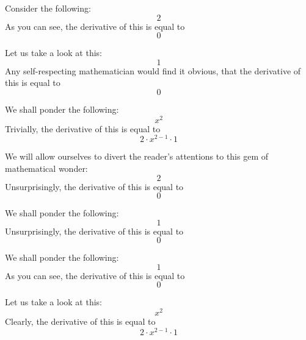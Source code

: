\documentclass{article}
\begin{document}
Consider the following:
\begin{equation}
2 
\end{equation}
As you can see, the derivative of this is equal to
\begin{equation}
0 
\end{equation}

Let us take a look at this:
\begin{equation}
1 
\end{equation}
Any self-respecting mathematician would find it obvious, that the derivative of this is equal to
\begin{equation}
0 
\end{equation}

We shall ponder the following:
\begin{equation}
x ^{2 } 
\end{equation}
Trivially, the derivative of this is equal to
\begin{equation}
2 \cdot x ^{2 - 1 } \cdot 1 
\end{equation}

We will allow ourselves to divert the reader's attentions to this gem of mathematical wonder:
\begin{equation}
2 
\end{equation}
Unsurprisingly, the derivative of this is equal to
\begin{equation}
0 
\end{equation}

We shall ponder the following:
\begin{equation}
1 
\end{equation}
Unsurprisingly, the derivative of this is equal to
\begin{equation}
0 
\end{equation}

We shall ponder the following:
\begin{equation}
1 
\end{equation}
As you can see, the derivative of this is equal to
\begin{equation}
0 
\end{equation}

Let us take a look at this:
\begin{equation}
x ^{2 } 
\end{equation}
Clearly, the derivative of this is equal to
\begin{equation}
2 \cdot x ^{2 - 1 } \cdot 1 
\end{equation}
\end{document}
